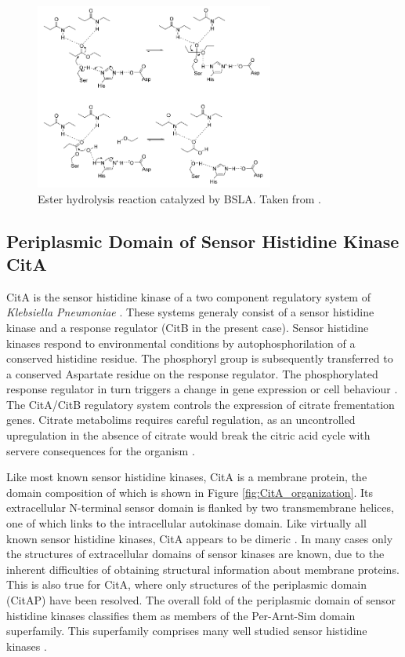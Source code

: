\documentclass[english, a4paper, 12pt, titlepage, draft]{article}
\begin{document}
\begin{figure}
    \centering
    \includegraphics[width=0.7\textwidth]{figures/BSLA_reaction.png}
    \caption{Ester hydrolysis reaction catalyzed by BSLA. Taken from \cite{BSLA_reaction}.}
    \label{fig:BSLAreaction}
\end{figure}  






\subsection{Periplasmic Domain of Sensor Histidine Kinase CitA}

CitA is the sensor histidine kinase of a two component regulatory system of \textit{Klebsiella Pneumoniae} \cite{CitA_original}.
These systems generaly consist of a sensor histidine kinase and a response regulator (CitB in the present case).
Sensor histidine kinases respond to environmental conditions by autophosphorilation of a conserved histidine residue.
The phosphoryl group is subsequently transferred to a conserved Aspartate residue on the response regulator.
The phosphorylated response regulator in turn triggers a change in gene expression or cell behaviour \cite{CitA_original}.
The CitA/CitB regulatory system controls the expression of citrate frementation genes.
Citrate metabolims requires careful regulation, as an uncontrolled upregulation in the absence of citrate would break the citric acid cycle with servere consequences for the organism \cite{CitA_original}.

Like most known sensor histidine kinases, CitA is a membrane protein, the domain composition of which is shown in Figure \ref{fig:CitA_organization}.
Its extracellular N-terminal sensor domain is flanked by two transmembrane helices, one of which links to the intracellular autokinase domain.
Like virtually all known sensor histidine kinases, CitA appears to be dimeric \cite{2CST}.
In many cases only the structures of extracellular domains of sensor kinases are known, due to the inherent difficulties of obtaining structural information about membrane proteins.
This is also true for CitA, where only structures of the periplasmic domain (CitAP) have been resolved.
The overall fold of the periplasmic domain of sensor histidine kinases classifies them as members of the Per-Arnt-Sim domain superfamily.
This superfamily comprises many well studied sensor histidine kinases \cite{PAS}.
\end{document}
